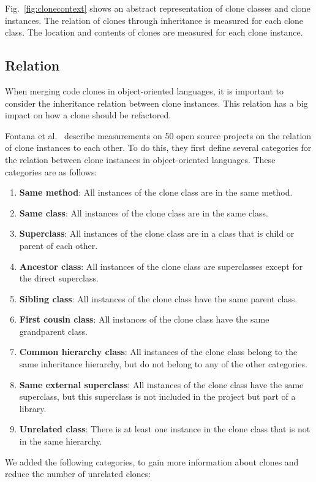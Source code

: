 Fig.~\ref{fig:clonecontext} shows an abstract representation of clone classes and clone instances. The relation of clones through inheritance is measured for each clone class. The location and contents of clones are measured for each clone instance.

\subsection{Relation}
When merging code clones in object-oriented languages, it is important to consider the inheritance relation between clone instances. This relation has a big impact on how a clone should be refactored.

Fontana et al.~\cite{fontana2015duplicated} describe measurements on 50 open source projects on the relation of clone instances to each other. To do this, they first define several categories for the relation between clone instances in object-oriented languages. These categories are as follows:
\begin{enumerate}
  \item \textbf{Same method}: All instances of the clone class are in the same method.
  \item \textbf{Same class}: All instances of the clone class are in the same class.
  \item \textbf{Superclass}: All instances of the clone class are in a class that is child or parent of each other.
  \item \textbf{Ancestor class}: All instances of the clone class are superclasses except for the direct superclass.
  \item \textbf{Sibling class}: All instances of the clone class have the same parent class.
  \item \textbf{First cousin class}: All instances of the clone class have the same grandparent class.
\item \textbf{Common hierarchy class}: All instances of the clone class belong to the same inheritance hierarchy, but do not belong to any of the other categories.
\item \textbf{Same external superclass}: All instances of the clone class have the same superclass, but this superclass is not included in the project but part of a library.
\item \textbf{Unrelated class}: There is at least one instance in the clone class that is not in the same hierarchy.
\end{enumerate}

We added the following categories, to gain more information about clones and reduce the number of unrelated clones:

